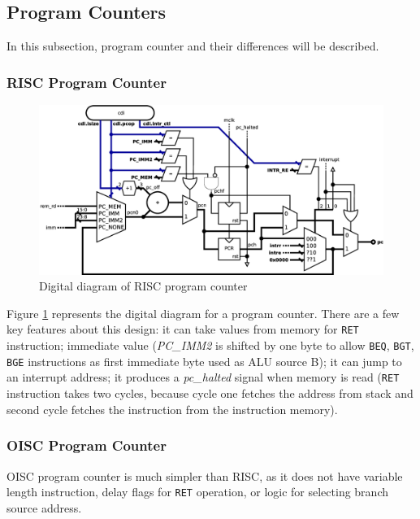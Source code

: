 \subsection{Program Counters} \label{subsec:pc}
In this subsection, program counter and their differences will be described.

\subsubsection{RISC Program Counter}

\begin{figure}[h!]
	\centering
	\includegraphics[width=\linewidth]{../resources/risc_pc.eps}
	\caption{Digital diagram of RISC program counter}
	\label{fig:risc_pc}
\end{figure}

Figure \ref{fig:risc_pc} represents the digital diagram for a program counter. There are a few key features about this design: it can take values from memory for \texttt{RET} instruction; immediate value (\textit{PC\_IMM2} is shifted by one byte to allow \texttt{BEQ}, \texttt{BGT}, \texttt{BGE} instructions as first immediate byte used as ALU source B); it can jump to an interrupt address; it produces a \textit{pc\_halted} signal when memory is read (\texttt{RET} instruction takes two cycles, because cycle one fetches the address from stack and second cycle fetches the instruction from the instruction memory).

\subsubsection{OISC Program Counter}\label{subsec:oisc_pc}
 
OISC program counter is much simpler than RISC, as it does not have variable length instruction, delay flags for \texttt{RET} operation, or logic for selecting branch source address. 
 
